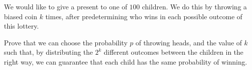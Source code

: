 We would like to give a present to one of $100$ children. We do this by throwing a biased coin $k$ times, after predetermining who wins in each possible outcome of this lottery.

Prove that we can choose the probability $p$ of throwing heads, and the value of $k$ such that, by distributing the $2^k$ different outcomes between the children in the right way, we can guarantee that each child has the same probability of winning.